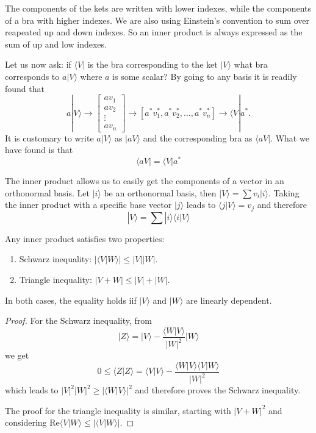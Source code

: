 \documentclass[11pt,fleqn]{book} %
\newcommand{\bra}[1]{\langle #1|}
\newcommand{\ket}[1]{| #1\rangle}
\newcommand{\scalar}[2]{\langle #1| #2\rangle}
\begin{document}
\begin{remark}
    The components of the kets are written with lower indexes, while the components of a bra with higher indexes. We are also using Einstein's 
    convention to sum over reapeated up and down indexes. So an inner product is always expressed as the sum of up and low indexes.
\end{remark}

Let us now ask: if $\bra{V}$ is the bra corresponding to the ket $\ket{V}$ what bra corresponds to $a\ket{V}$ where $a$ is some scalar?
By going to any basis it is readily found that
\begin{equation*}
    a\ket{V}\rightarrow
    \left[\begin{array}{c}
        av_1\\
        av_2\\
        \vdots\\
        av_n
    \end{array}\right]
    \rightarrow [a^*v_1^*, a^*v_2^*, \dots,a^*v_n^*]\rightarrow\bra{V}a^*.
\end{equation*}
It is customary to write $a\ket{V}$ as $\ket{aV}$ and the corresponding bra as $\bra{aV}$. What we have found is that
\begin{equation}
    \label{eq:bra_components_2}
    \bra{aV}=\bra{V}a^*
\end{equation}

The inner product allows us to easily get the components of a vector in an orthonormal basis. Let $\ket{i}$ be an orthonormal basis, then
$\ket{V}=\sum v_i\ket{i}$.
Taking the inner product with a specific base vector $\ket{j}$ leads to $\scalar{j}{V}=v_j$ and therefore
\begin{equation}
    \ket{V}=\sum\ket{i}\scalar{i}{V}
\end{equation}

\begin{theorem}
    Any inner product satisfies two properties:
    \begin{enumerate}
        \item Schwarz inequality: $|\scalar{V}{W}|\leq|V||W|$.
        \item Triangle inequality: $|V+W|\leq|V|+|W|$.
    \end{enumerate}
    In both cases, the equality holds iif $\ket{V}$ and $\ket{W}$ are linearly dependent.
\end{theorem}
\begin{proof}
    For the Schwarz inequality, from
    \begin{equation*}
        \ket{Z}=\ket{V}-\frac{\scalar{W}{V}}{|W|^2}\ket{W}
    \end{equation*}
    we get
    \begin{equation*}
        0\leq\scalar{Z}{Z}=\scalar{V}{V}-\frac{\scalar{W}{V}\scalar{V}{W}}{|W|^2}
    \end{equation*}
    which leads to
    $|V|^2|W|^2\geq|\scalar{W}{V}|^2$ and therefore proves the Schwarz inequality.

    The proof for the triangle inequality is similar, starting with $|V+W|^2$ and considering $\mbox{Re}\scalar{V}{W}\leq|\scalar{V}{W}|$.
\end{proof}
\end{document}
